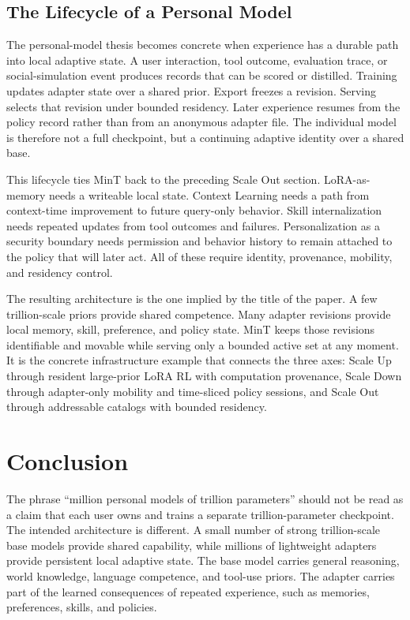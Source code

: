 \documentclass{llmxive}
\providecommand{\pony}[1]{#1}
\begin{document}
\subsection{\pony{The Lifecycle of a Personal Model}}\label{subsec:infra-personal-lifecycle}

The personal-model thesis becomes concrete when experience has a durable path into local adaptive state. A user interaction, tool outcome, evaluation trace, or social-simulation event produces records that can be scored or distilled. Training updates adapter state over a shared prior. Export freezes a revision. Serving selects that revision under bounded residency. Later experience resumes from the policy record rather than from an anonymous adapter file. The individual model is therefore not a full checkpoint, but a continuing adaptive identity over a shared base.

This lifecycle ties MinT back to the preceding Scale Out section. LoRA-as-memory needs a writeable local state. Context Learning needs a path from context-time improvement to future query-only behavior. Skill internalization needs repeated updates from tool outcomes and failures. Personalization as a security boundary needs permission and behavior history to remain attached to the policy that will later act. All of these require identity, provenance, mobility, and residency control.

The resulting architecture is the one implied by the title of the paper. A few trillion-scale priors provide shared competence. Many adapter revisions provide local memory, skill, preference, and policy state. MinT keeps those revisions identifiable and movable while serving only a bounded active set at any moment. It is the concrete infrastructure example that connects the three axes: Scale Up through resident large-prior LoRA RL with computation provenance, Scale Down through adapter-only mobility and time-sliced policy sessions, and Scale Out through addressable catalogs with bounded residency.


\section{Conclusion}\label{sec:conclusion}

\pony{The phrase ``million personal models of trillion parameters'' should not be read as a claim that each user owns and trains a separate trillion-parameter checkpoint. The intended architecture is different. A small number of strong trillion-scale base models provide shared capability, while millions of lightweight adapters provide persistent local adaptive state. The base model carries general reasoning, world knowledge, language competence, and tool-use priors. The adapter carries part of the learned consequences of repeated experience, such as memories, preferences, skills, and policies.}
\end{document}
